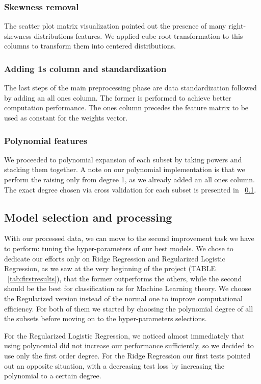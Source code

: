 \documentclass[10pt,article]{IEEEtran}
\begin{document}
\subsubsection{Skewness removal} The scatter plot matrix visualization pointed out the presence of many right-skewness distributions features. We applied cube root transformation to this columns to transform them into centered distributions.
\subsubsection{Adding 1s column and standardization} The last steps of the main preprocessing phase are data standardization followed by adding an all ones column. The former is performed to achieve better computation performance. The ones column precedes the feature matrix to be used as constant for the weights vector.
\subsubsection{Polynomial features} We proceeded to polynomial expansion of each subset by taking powers and stacking them together. A note on our polynomial implementation is that we perform the raising only from degree 1, as we already added an all ones column. The exact degree chosen via cross validation for each subset is presented in ~\ref{subsec:model-proc}.

\subsection{Model selection and processing}
\label{subsec:model-proc}
With our processed data, we can move to the second improvement task we have to perform: tuning the hyper-parameters of our best models.
We chose to dedicate our efforts only on Ridge Regression and Regularized Logistic Regression, as we saw at the very beginning of the project (TABLE ~\ref{tab:firstresults}), that the former outperforms the others, while the second should be the best for classification as for Machine Learning theory. We choose the Regularized version instead of the normal one to improve computational efficiency. For both of them we started by choosing the polynomial degree of all the subsets before moving on to the hyper-parameters selections.

For the Regularized Logistic Regression, we noticed almost immediately that using polynomial did not increase our performance sufficiently, so we decided to use only the first order degree. For the Ridge Regression our first tests pointed out an opposite situation, with a decreasing test loss by increasing the polynomial to a certain degree. 
\end{document}
